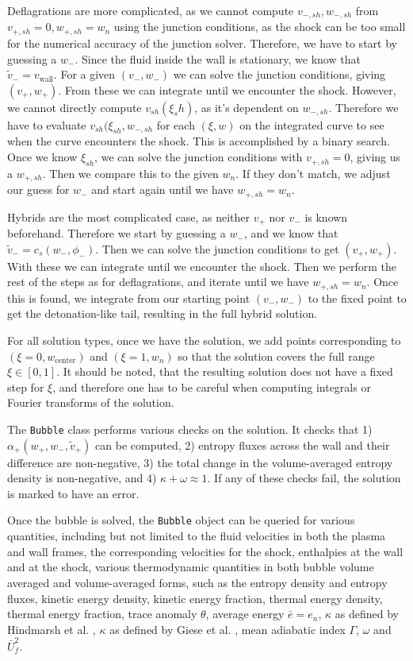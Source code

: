 Deflagrations are more complicated,
as we cannot compute $v_{-,sh}, w_{-,sh}$ from $v_{+,sh}=0, w_{+,sh}=w_n$ using the junction conditions,
as the shock can be too small for the numerical accuracy of the junction solver.
Therefore, we have to start by guessing a $w_-$.
Since the fluid inside the wall is stationary, we know that $\tilde{v}_- = v_{\text{wall}}$.
For a given $(v_-, w_-)$ we can solve the junction conditions, giving $(v_+, w_+)$.
From these we can integrate until we encounter the shock.
However, we cannot directly compute $v_{sh}(\xi_sh)$, as it's dependent on $w_{-,sh}$.
Therefore we have to evaluate $v_{sh}(\xi_{sh}, w_{-,sh}$ for each $(\xi, w)$ on the integrated curve to see
when the curve encounters the shock.
This is accomplished by a binary search.
Once we know $\xi_{sh}$, we can solve the junction conditions with $v_{+,sh} = 0$, giving us a $w_{+,sh}$.
Then we compare this to the given $w_n$.
If they don't match, we adjust our guess for $w_-$ and start again until we have $w_{+,sh} = w_n$.

Hybrids are the most complicated case, as neither $v_+$ nor $v_-$ is known beforehand.
Therefore we start by guessing a $w_-$, and we know that $\tilde{v}_- = c_s(w_-, \phi_-)$.
Then we can solve the junction conditions to get $(v_+, w_+)$.
With these we can integrate until we encounter the shock.
Then we perform the rest of the steps as for deflagrations, and iterate until we have $w_{+,sh} = w_n$.
Once this is found, we integrate from our starting point $(v_-, w_-)$ to the fixed point to get the detonation-like tail,
resulting in the full hybrid solution.

For all solution types, once we have the solution,
we add points corresponding to $(\xi=0, w_\text{center})$ and $(\xi=1, w_n)$
so that the solution covers the full range $\xi \in [0, 1]$.
It should be noted, that the resulting solution does not have a fixed step for $\xi$,
and therefore one has to be careful when computing integrals or Fourier transforms of the solution.

The \verb|Bubble| class performs various checks on the solution.
It checks that
1) $\alpha_+(w_+, w_-, \tilde{v}_+)$ can be computed,
2) entropy fluxes across the wall and their difference are non-negative,
3) the total change in the volume-averaged entropy density is non-negative, and
4) $\kappa + \omega \approx 1$.
If any of these checks fail, the solution is marked to have an error.

Once the bubble is solved, the \verb|Bubble| object can be queried for various quantities,
including but not limited to the fluid velocities in both the plasma and wall frames,
the corresponding velocities for the shock,
enthalpies at the wall and at the shock,
various thermodynamic quantities in both bubble volume averaged and volume-averaged forms,
such as the entropy density and entropy fluxes,
kinetic energy density,
kinetic energy fraction,
thermal energy density,
thermal energy fraction,
trace anomaly $\theta$,
average energy $\bar{e} = e_n$,
$\kappa$ as defined by Hindmarsh et al. ,
$\kappa$ as defined by Giese et al. ,
mean adiabatic index $\Gamma$,
$\omega$ and
$\bar{U}_f^2$.


